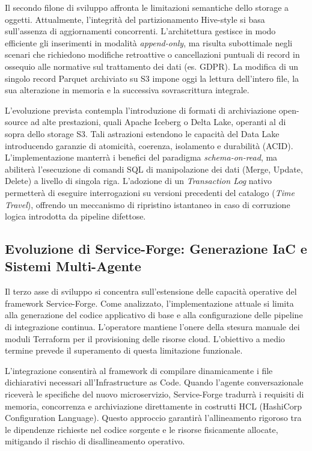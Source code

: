 Il secondo filone di sviluppo affronta le limitazioni semantiche dello storage a oggetti. Attualmente, l'integrità del partizionamento Hive-style si basa sull'assenza di aggiornamenti concorrenti. L'architettura gestisce in modo efficiente gli inserimenti in modalità \emph{append-only}, ma risulta subottimale negli scenari che richiedono modifiche retroattive o cancellazioni puntuali di record in ossequio alle normative sul trattamento dei dati (es. GDPR). La modifica di un singolo record Parquet archiviato su S3 impone oggi la lettura dell'intero file, la sua alterazione in memoria e la successiva sovrascrittura integrale.

L'evoluzione prevista contempla l'introduzione di formati di archiviazione open-source ad alte prestazioni, quali Apache Iceberg o Delta Lake, operanti al di sopra dello storage S3. Tali astrazioni estendono le capacità del Data Lake introducendo garanzie di atomicità, coerenza, isolamento e durabilità (ACID). L'implementazione manterrà i benefici del paradigma \emph{schema-on-read}, ma abiliterà l'esecuzione di comandi SQL di manipolazione dei dati (Merge, Update, Delete) a livello di singola riga. L'adozione di un \emph{Transaction Log} nativo permetterà di eseguire interrogazioni su versioni precedenti del catalogo (\emph{Time Travel}), offrendo un meccanismo di ripristino istantaneo in caso di corruzione logica introdotta da pipeline difettose.

\subsection{Evoluzione di Service-Forge: Generazione IaC e Sistemi Multi-Agente}
Il terzo asse di sviluppo si concentra sull'estensione delle capacità operative del framework Service-Forge. Come analizzato, l'implementazione attuale si limita alla generazione del codice applicativo di base e alla configurazione delle pipeline di integrazione continua. L'operatore mantiene l'onere della stesura manuale dei moduli Terraform per il provisioning delle risorse cloud. L'obiettivo a medio termine prevede il superamento di questa limitazione funzionale.

L'integrazione consentirà al framework di compilare dinamicamente i file dichiarativi necessari all'Infrastructure as Code. Quando l'agente conversazionale riceverà le specifiche del nuovo microservizio, Service-Forge tradurrà i requisiti di memoria, concorrenza e archiviazione direttamente in costrutti HCL (HashiCorp Configuration Language). Questo approccio garantirà l'allineamento rigoroso tra le dipendenze richieste nel codice sorgente e le risorse fisicamente allocate, mitigando il rischio di disallineamento operativo.

